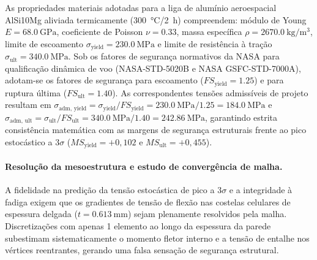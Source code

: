 As propriedades materiais adotadas para a liga de alumínio aeroespacial AlSi10Mg aliviada termicamente (\SI{300}{\celsius}/\SI{2}{\hour}) compreendem: módulo de Young $E = \SI{68.0}{\giga\pascal}$, coeficiente de Poisson $\nu = \num{0.33}$, massa específica $\rho = \SI{2670.0}{\kilo\gram\per\cubic\metre}$, limite de escoamento $\sigma_{\text{yield}} = \SI{230.0}{\mega\pascal}$ e limite de resistência à tração $\sigma_{\text{ult}} = \SI{340.0}{\mega\pascal}$. Sob os fatores de segurança normativos da NASA para qualificação dinâmica de voo (NASA-STD-5020B e NASA GSFC-STD-7000A), adotam-se os fatores de segurança para escoamento ($FS_{\text{yield}} = \num{1.25}$) e para ruptura última ($FS_{\text{ult}} = \num{1.40}$). As correspondentes tensões admissíveis de projeto resultam em $\sigma_{\text{adm, yield}} = \sigma_{\text{yield}} / FS_{\text{yield}} = \SI{230.0}{\mega\pascal} / \num{1.25} = \SI{184.0}{\mega\pascal}$ e $\sigma_{\text{adm, ult}} = \sigma_{\text{ult}} / FS_{\text{ult}} = \SI{340.0}{\mega\pascal} / \num{1.40} = \SI{242.86}{\mega\pascal}$, garantindo estrita consistência matemática com as margens de segurança estruturais frente ao pico estocástico a $3\sigma$ ($MS_{\text{yield}} = +0{,}102$ e $MS_{\text{ult}} = +0{,}455$).

\paragraph*{Resolução da mesoestrutura e estudo de convergência de malha.}
A fidelidade na predição da tensão estocástica de pico a $3\sigma$ e a integridade à fadiga exigem que os gradientes de tensão de flexão nas costelas celulares de espessura delgada ($t = \SI{0.613}{\milli\metre}$) sejam plenamente resolvidos pela malha. Discretizações com apenas 1 elemento ao longo da espessura da parede subestimam sistematicamente o momento fletor interno e a tensão de entalhe nos vértices reentrantes, gerando uma falsa sensação de segurança estrutural.

